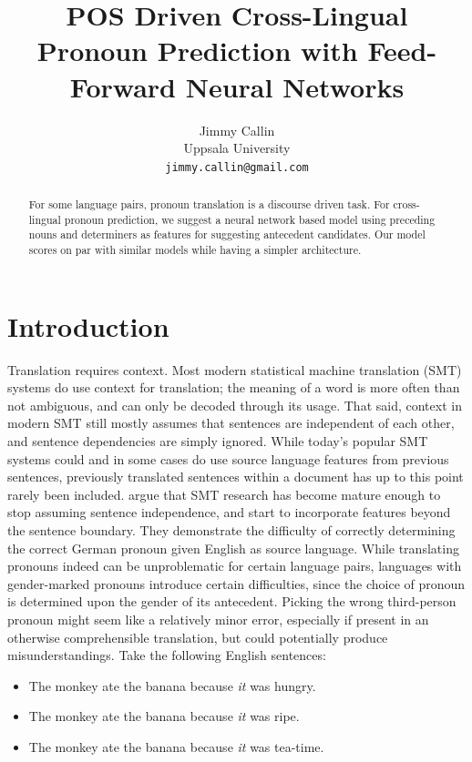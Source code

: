 \documentclass[11pt]{article}
\title{POS Driven Cross-Lingual Pronoun Prediction with Feed-Forward Neural Networks}
\author{Jimmy Callin \\
  Uppsala University \\
  {\tt jimmy.callin@gmail.com}}
\date{}
\begin{document}
\maketitle
\begin{abstract}
    For some language pairs, pronoun translation is a discourse driven task. For cross-lingual pronoun prediction, we suggest a neural network based model using preceding nouns and determiners as features for suggesting antecedent candidates. Our model scores on par with similar models while having a simpler architecture.
\end{abstract}


\section{Introduction}

Translation requires context.
Most modern statistical machine translation (SMT) systems do use context for translation; the meaning of a word is more often than not ambiguous, and can only be decoded through its usage.
That said, context in modern SMT still mostly assumes that sentences are independent of each other, and sentence dependencies are simply ignored.
While today's popular SMT systems could and in some cases do use source language features from previous sentences, previously translated sentences within a document has up to this point rarely been included.
\textcite{Hardmeier2010Modelling} argue that SMT research has become mature enough to stop assuming sentence independence, and start to incorporate features beyond the sentence boundary.
They demonstrate the difficulty of correctly determining the correct German pronoun given English as source language.
While translating pronouns indeed can be unproblematic for certain language pairs, languages with gender-marked pronouns introduce certain difficulties, since the choice of pronoun is determined upon the gender of its antecedent.
Picking the wrong third-person pronoun might seem like a relatively minor error, especially if present in an otherwise comprehensible translation, but could potentially produce misunderstandings. Take the following English sentences:

\begin{itemize}
    \setlength{\itemsep}{-0.2em}
    \item The monkey ate the banana because \emph{it} was hungry.
    \item The monkey ate the banana because \emph{it} was ripe.
    \item The monkey ate the banana because \emph{it} was tea-time.
\end{itemize}
\end{document}
